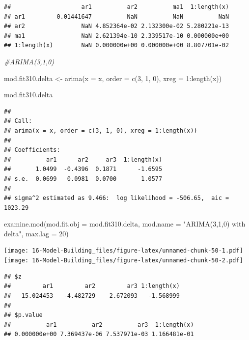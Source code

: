 \documentclass[
]{book}
\newenvironment{Shaded}{\begin{snugshade}}{\end{snugshade}}
\newcommand{\AttributeTok}[1]{\textcolor[rgb]{0.77,0.63,0.00}{#1}}
\newcommand{\CommentTok}[1]{\textcolor[rgb]{0.56,0.35,0.01}{\textit{#1}}}
\newcommand{\DecValTok}[1]{\textcolor[rgb]{0.00,0.00,0.81}{#1}}
\newcommand{\FunctionTok}[1]{\textcolor[rgb]{0.00,0.00,0.00}{#1}}
\newcommand{\NormalTok}[1]{#1}
\newcommand{\OtherTok}[1]{\textcolor[rgb]{0.56,0.35,0.01}{#1}}
\newcommand{\SpecialCharTok}[1]{\textcolor[rgb]{0.00,0.00,0.00}{#1}}
\newcommand{\StringTok}[1]{\textcolor[rgb]{0.31,0.60,0.02}{#1}}
\theoremstyle{definition}
\theoremstyle{definition}
\theoremstyle{definition}
\theoremstyle{definition}
\theoremstyle{remark}
\begin{document}
\begin{verbatim}
##                    ar1          ar2          ma1  1:length(x)
## ar1         0.01441647          NaN          NaN          NaN
## ar2                NaN 4.852364e-02 2.132300e-02 5.280221e-13
## ma1                NaN 2.621394e-10 2.339517e-10 0.000000e+00
## 1:length(x)        NaN 0.000000e+00 0.000000e+00 8.807701e-02
\end{verbatim}

\begin{Shaded}
\begin{Highlighting}[]
\CommentTok{\#ARIMA(3,1,0)}
  
\NormalTok{mod.fit310.delta }\OtherTok{\textless{}{-}} \FunctionTok{arima}\NormalTok{(}\AttributeTok{x =}\NormalTok{ x, }\AttributeTok{order =} \FunctionTok{c}\NormalTok{(}\DecValTok{3}\NormalTok{, }\DecValTok{1}\NormalTok{, }\DecValTok{0}\NormalTok{), }\AttributeTok{xreg =} \DecValTok{1}\SpecialCharTok{:}\FunctionTok{length}\NormalTok{(x))}
  
\NormalTok{mod.fit310.delta}
\end{Highlighting}
\end{Shaded}

\begin{verbatim}
## 
## Call:
## arima(x = x, order = c(3, 1, 0), xreg = 1:length(x))
## 
## Coefficients:
##          ar1      ar2     ar3  1:length(x)
##       1.0499  -0.4396  0.1871      -1.6595
## s.e.  0.0699   0.0981  0.0700       1.0577
## 
## sigma^2 estimated as 9.466:  log likelihood = -506.65,  aic = 1023.29
\end{verbatim}

\begin{Shaded}
\begin{Highlighting}[]
\FunctionTok{examine.mod}\NormalTok{(}\AttributeTok{mod.fit.obj =}\NormalTok{ mod.fit310.delta, }\AttributeTok{mod.name =} \StringTok{"ARIMA(3,1,0) with delta"}\NormalTok{, }\AttributeTok{max.lag =} \DecValTok{20}\NormalTok{)}
\end{Highlighting}
\end{Shaded}

\texttt{[image: 16-Model-Building\_files/figure-latex/unnamed-chunk-50-1.pdf]} \texttt{[image: 16-Model-Building\_files/figure-latex/unnamed-chunk-50-2.pdf]}

\begin{verbatim}
## $z
##         ar1         ar2         ar3 1:length(x) 
##   15.024453   -4.482729    2.672093   -1.568999 
## 
## $p.value
##          ar1          ar2          ar3  1:length(x) 
## 0.000000e+00 7.369437e-06 7.537971e-03 1.166481e-01
\end{verbatim}
\end{document}
